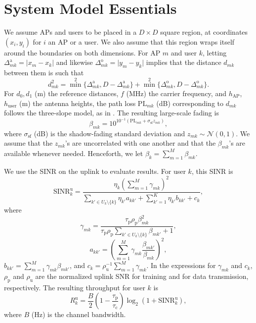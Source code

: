 \documentclass[]{IEEEtran}
\begin{document}
\section{System Model Essentials}
\label{smod}

We assume APs and users to be placed in a $D\times D$ square region, at
coordinates $(x_i,y_i)$ for $i$ an AP or a user. We also assume that this region
wraps itself around the boundaries on both dimensions. For AP $m$ and user $k$,
letting $\Delta_{mk}^\mathrm{a}=\vert x_m-x_k\vert$ and likewise
$\Delta_{mk}^\mathrm{o}=\vert y_m-y_k\vert$ implies that the distance $d_{mk}$
between them is such that
\begin{equation}
d_{mk}^2=
{\textstyle\min^2}\{\Delta_{mk}^\mathrm{a},D-\Delta_{mk}^\mathrm{a}\}+
{\textstyle\min^2}\{\Delta_{mk}^\mathrm{o},D-\Delta_{mk}^\mathrm{o}\}.
\end{equation}
For $d_0,d_1$ (m) the reference distances, $f$ (MHz) the carrier frequency, and
$h_\mathrm{AP}$,$h_\mathrm{user}$ (m) the antenna heights, the path loss
$\mathrm{PL}_{mk}$ (dB) corresponding to $d_{mk}$ follows the three-slope model,
as in \cite{naylm17}. The resulting large-scale fading is
\begin{equation}
\beta_{mk}=10^{10^{-1}(\mathrm{PL}_{mk}+\sigma_\mathrm{sf}z_{mk})},
\end{equation}
where $\sigma_\mathrm{sf}$ (dB) is the shadow-fading standard deviation and
$z_{mk}\sim\mathcal{N}(0,1)$. We assume that the $z_{mk}$'s are uncorrelated
with one another and that the $\beta_{mk}$'s are available whenever needed.
Henceforth, we let $\beta_k=\sum_{m=1}^M\beta_{mk}$.

We use the SINR on the uplink to evaluate results. For user $k$, this SINR is
\begin{equation}
\mathrm{SINR}_k^\mathrm{u}=
\frac
{\eta_k\left(\sum_{m=1}^M\gamma_{mk}\right)^2}
{\sum_{k'\in U_k\setminus\{k\}}
\eta_{k'}a_{kk'}+\sum_{k'=1}^K\eta_{k'}b_{kk'}+c_k},
\label{sinr}
\end{equation}
where
\begin{equation}
\gamma_{mk}=\frac
{\tau_\mathrm{p}\rho_\mathrm{p}\beta_{mk}^2}
{\tau_\mathrm{p}\rho_\mathrm{p}\sum_{k'\in U_k\setminus\{k\}}\beta_{mk'}+1},
\end{equation}
\begin{equation}
a_{kk'}=\left(\sum_{m=1}^M \gamma_{mk}\frac{\beta_{mk'}}{\beta_{mk}}\right)^2,
\end{equation}
$b_{kk'}=\sum_{m=1}^M\gamma_{mk}\beta_{mk'}$, and
$c_k=\rho_\mathrm{u}^{-1}\sum_{m=1}^M\gamma_{mk}$.
In the expressions for $\gamma_{mk}$ and $c_k$, $\rho_\mathrm{p}$ and
$\rho_\mathrm{u}$ are the normalized uplink SNR for training and for data
transmission, respectively. The resulting throughput for user $k$ is
\begin{equation}
R_k^\mathrm{u}=
\frac{B}{2}
\left(1-\frac{\tau_\mathrm{p}}{\tau_\mathrm{c}}\right)
\log_2(1+\mathrm{SINR}_k^\mathrm{u}),
\label{rate}
\end{equation}
where $B$ (Hz) is the channel bandwidth.
\end{document}
